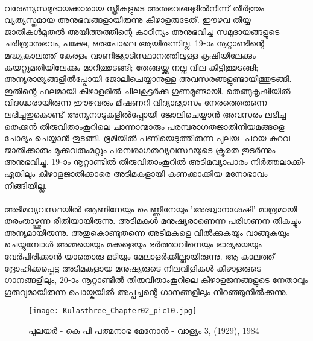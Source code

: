 \paragraph{}വരേണ്യസമുദായക്കാരായ സ്ത്രീകളുടെ അനുഭവങ്ങളിൽനിന്ന് തീർത്തും വ്യത്യസ്തമായ അനുഭവങ്ങളായിരുന്നു കീഴാളരുടേത്. ഈഴവ-തീയ്യ ജാതികൾമുതൽ അയിത്തത്തിന്റെ കാഠിന്യം അനുഭവിച്ച സമുദായങ്ങളുടെ ചരിത്രാനുഭവം, പക്ഷേ, ഒരുപോലെ ആയിരുന്നില്ല. 19-ാം നൂറ്റാണ്ടിന്റെ മദ്ധ്യകാലത്ത് കേരളം വാണിജ്യാടിസ്ഥാനത്തിലുള്ള കൃഷിയിലേക്കും കയറ്റുമതിയിലേക്കും മാറിത്തുടങ്ങി; തേങ്ങയ്ക്കു നല്ല വില കിട്ടിത്തുടങ്ങി; അന്യരാജ്യങ്ങളിൽപ്പോയി ജോലിചെയ്യാനുള്ള അവസരങ്ങളുണ്ടായിത്തുടങ്ങി. ഇതിന്റെ ഫലമായി കീഴാളരിൽ ചിലകൂട്ടർക്കു ഗുണമുണ്ടായി. തെങ്ങുകൃഷിയിൽ വിദഗ്ദ്ധരായിരുന്ന ഈഴവരും മിഷണറി വിദ്യാഭ്യാസം നേരത്തെതന്നെ ലഭിച്ചതുകൊണ്ട് അന്യനാടുകളിൽപ്പോയി ജോലിചെയ്യാൻ അവസരം ലഭിച്ച തെക്കൻ തിരുവിതാംകൂറിലെ ചാന്നാന്മാരും പരമ്പരാഗതജാതിനിയമങ്ങളെ ചോദ്യം ചെയ്യാൻ തുടങ്ങി. ഭൂമിയിൽ പണിയെടുത്തിരുന്ന പുലയ- പറയ-കുറവ ജാതിക്കാരും മുക്കുവരുംമറ്റും പരമ്പരാഗതവ്യവസ്ഥയുടെ ക്രൂരത തുടർന്നും അനുഭവിച്ചു. 19-ാം നൂറ്റാണ്ടിൽ തിരുവിതാംകൂറിൽ അടിമവ്യാപാരം നിർത്തലാക്കി-എങ്കിലും കീഴാളജാതിക്കാരെ അടിമകളായി കണക്കാക്കിയ മനോഭാവം നീങ്ങിയില്ല.
\paragraph{}അടിമവ്യവസ്ഥയിൽ ആണിനേയും പെണ്ണിനേയും 'അദ്ധ്വാനശേഷി' മാത്രമായി തരംതാഴ്ത്തുന്ന രീതിയായിരുന്നു. അടിമകൾ മനുഷ്യരാണെന്ന പരിഗണന തികച്ചും അന്യമായിരുന്നു. അതുകൊണ്ടുതന്നെ അടിമകളെ വിൽക്കുകയും വാങ്ങുകയും ചെയ്യുമ്പോൾ അമ്മയെയും മക്കളെയും ഭർത്താവിനെയും ഭാര്യയെയും വേർപിരിക്കാൻ യാതൊരു മടിയും മേലാളർക്കില്ലായിരുന്നു. ആ കാലത്ത് ദ്രോഹിക്കപ്പെട്ട അടിമകളായ മനുഷ്യരുടെ നിലവിളികൾ കീഴാളരുടെ ഗാനങ്ങളിലും, 20-ാം നൂറ്റാണ്ടിൽ തിരുവിതാംകൂറിലെ കീഴാളജനങ്ങളുടെ നേതാവും ഗുരുവുമായിരുന്ന പൊയ്കയിൽ അപ്പച്ചന്റെ ഗാനങ്ങളിലും നിറഞ്ഞുനിൽക്കുന്നു.

\begin{figure}[h]
\begin{center}
\texttt{[image: Kulasthree\_Chapter02\_pic10.jpg]}
\end{center}
\caption*{പുലയർ - കെ പി പത്മനാഭ മേനോൻ - വാള്യം 3, (1929), 1984}
\end{figure}

